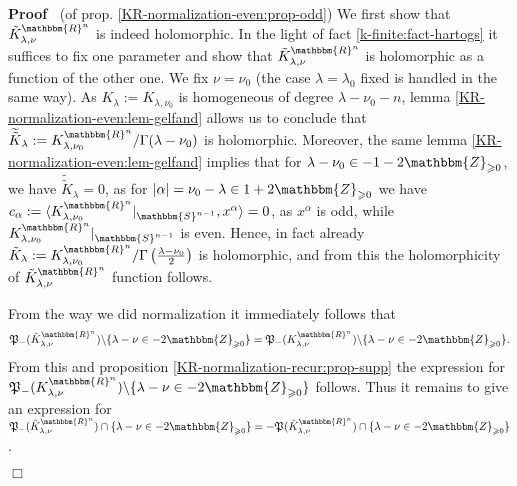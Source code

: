 \documentclass{article}
\newcommand{\assign}{:=}
\newenvironment{proof}{\noindent\textbf{Proof\ }}{\hspace*{\fill}$\Box$\medskip}
\numberwithin{definition}{section}
\numberwithin{lemma}{section}
\numberwithin{proposition}{section}
{\theorembodyfont{\rmfamily}\newtheorem{remark}{Remark}
\numberwithin{remark}{section}
}
\begin{document}
\begin{proof}
  (of prop. \ref{KR-normalization-even:prop-odd}) We first show that
  $\tilde{K}_{\lambda, \nu}^{\mathbbm{R}^n}$ is indeed holomorphic. In the
  light of fact \ref{k-finite:fact-hartogs} it suffices to fix one parameter
  and show that $\tilde{K}_{\lambda, \nu}^{\mathbbm{R}^n}$ is holomorphic as a
  function of the other one. We fix $\nu = \nu_0$ (the case $\lambda =
  \lambda_0$ fixed is handled in the same way). As $K_{\lambda} \assign
  K_{\lambda, \nu_0}$ is homogeneous of degree $\lambda - \nu_0 - n$, lemma
  \ref{KR-normalization-even:lem-gelfand} allows us to conclude that
  $\widetilde{\tilde{K}}_{\lambda} \assign K_{\lambda, \nu_0}^{\mathbbm{R}^n}
  / \Gamma ( \lambda - \nu_0)$ is holomorphic. Moreover, the same lemma
  \ref{KR-normalization-even:lem-gelfand} implies that for $\lambda - \nu_0
  \in - 1 - 2\mathbbm{Z}_{\geqslant 0}$, we have
  $\widetilde{\tilde{K}}_{\lambda} = 0$, as for $| \alpha | = \nu_0 - \lambda
  \in 1 + 2\mathbbm{Z}_{\geqslant 0}$ we have $c_{\alpha} \assign \langle
  K_{\lambda, \nu_0}^{\mathbbm{R}^n} |_{\mathbbm{S}^{n - 1}}, x^{\alpha}
  \rangle = 0$, as $x^{\alpha}$ is odd, while $K_{\lambda,
  \nu_0}^{\mathbbm{R}^n} |_{\mathbbm{S}^{n - 1}}$ is even. Hence, in fact
  already $\tilde{K}_{\lambda} \assign K_{\lambda, \nu_0}^{\mathbbm{R}^n} /
  \Gamma \left( \frac{\lambda - \nu_0}{2} \right)$ is holomorphic, and from
  this the holomorphicity of $\tilde{K}_{\lambda, \nu}^{\mathbbm{R}^n}$
  function follows.
  
  From the way we did normalization it immediately follows that
  \[ \mathfrak{P}_- ( \tilde{K}_{\lambda, \nu}^{\mathbbm{R}^n}) \backslash \{
     \lambda - \nu \in - 2\mathbbm{Z}_{\geqslant 0} \} =\mathfrak{P}_- (
     K_{\lambda, \nu}^{\mathbbm{R}^n}) \backslash \{ \lambda - \nu \in -
     2\mathbbm{Z}_{\geqslant 0} \} . \]
  From this and proposition \ref{KR-normalization-recur:prop-supp} the
  expression for $\mathfrak{P}_- ( K_{\lambda, \nu}^{\mathbbm{R}^n})
  \backslash \{ \lambda - \nu \in - 2\mathbbm{Z}_{\geqslant 0} \}$ follows.
  Thus it remains to give an expression for $\mathfrak{P}_- (
  \tilde{K}_{\lambda, \nu}^{\mathbbm{R}^n}) \cap \{ \lambda - \nu \in -
  2\mathbbm{Z}_{\geqslant 0} \} = -\mathfrak{P}_{} ( \tilde{K}_{\lambda,
  \nu}^{\mathbbm{R}^n}) \cap \{ \lambda - \nu \in - 2\mathbbm{Z}_{\geqslant 0}
  \}$.
  

\end{proof}
\end{document}
